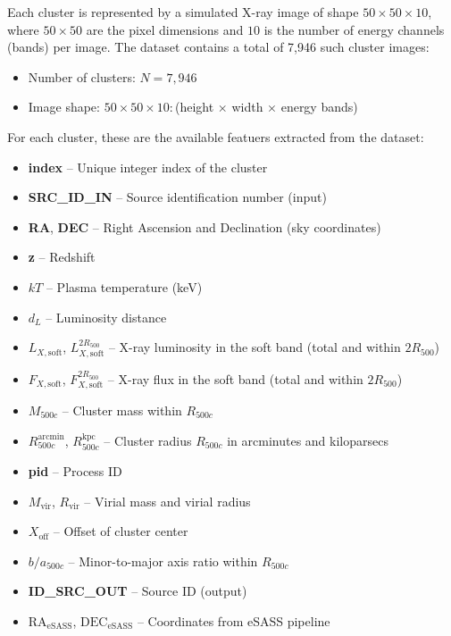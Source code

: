 Each cluster is represented by a simulated X-ray image of shape 
$50\times50\times10$, where $50\times50$ are the pixel dimensions and
$10$ is the number of energy channels (bands) per image. 
The dataset contains a total of 7,946 such cluster images:
\begin{itemize}
    \item Number of clusters: $N = 7,946$
    \item Image shape: $50 \times 50 \times 10:$(height $\times$ width $\times$ energy bands)
\end{itemize}

For each cluster, these are the available featuers extracted from the dataset:

\begin{itemize}
    \item \textbf{index} -- Unique integer index of the cluster
    \item \textbf{SRC\_ID\_IN} -- Source identification number (input)
    \item \textbf{RA}, \textbf{DEC} -- Right Ascension and Declination (sky coordinates)
    \item \textbf{z} -- Redshift
    \item $kT$ -- Plasma temperature (keV)
    \item $d_L$ -- Luminosity distance
    \item $L_{X,\mathrm{soft}}$, $L_{X,\mathrm{soft}}^{2R_{500}}$ -- X-ray luminosity in the soft band (total and within $2R_{500}$)
    \item $F_{X,\mathrm{soft}}$, $F_{X,\mathrm{soft}}^{2R_{500}}$ -- X-ray flux in the soft band (total and within $2R_{500}$)
    \item $M_{500c}$ -- Cluster mass within $R_{500c}$
    \item $R_{500c}^{\mathrm{arcmin}}$, $R_{500c}^{\mathrm{kpc}}$ -- Cluster radius $R_{500c}$ in arcminutes and kiloparsecs
    \item \textbf{pid} -- Process ID
    \item $M_{\mathrm{vir}}$, $R_{\mathrm{vir}}$ -- Virial mass and virial radius
    \item $X_{\mathrm{off}}$ -- Offset of cluster center
    \item $b/a_{500c}$ -- Minor-to-major axis ratio within $R_{500c}$
    \item \textbf{ID\_SRC\_OUT} -- Source ID (output)
    \item $\mathrm{RA}_{\mathrm{eSASS}}$, $\mathrm{DEC}_{\mathrm{eSASS}}$ -- Coordinates from eSASS pipeline

\end{itemize}
